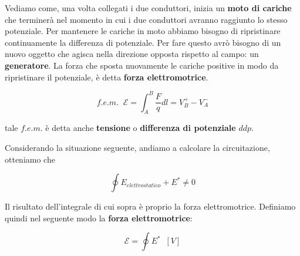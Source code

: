 Vediamo come, una volta collegati i due conduttori, inizia un \textbf{moto di cariche} che terminerà nel momento in cui i due conduttori avranno raggiunto lo stesso potenziale. Per mantenere le cariche in moto abbiamo bisogno di ripristinare continuamente la differenza di potenziale. Per fare questo avrò bisogno di un nuovo oggetto che agisca nella direzione opposta rispetto al campo: un \textbf{generatore}. La forza che sposta nuovamente le cariche positive in modo da ripristinare il potenziale, è detta \textbf{forza elettromotrice}. 

\begin{large}
	\begin{equation} \label{eq_fem}
		f.e.m. \;\; \mathcal{E} = \int_A^B \frac{F}{q} dl = V^+_B - V^-_A
	\end{equation}
\end{large}

tale $f.e.m.$ è detta anche \textbf{tensione} o \textbf{differenza di potenziale} $ddp$.

\begin{figure}[ht]
	\centering
\end{figure}

Considerando la situazione seguente, andiamo a calcolare la circuitazione, otteniamo che 

$$
\oint E_{elettrostatico} + E^* \ne 0
$$

Il risultato dell'integrale di cui sopra è proprio la forza elettromotrice. Definiamo quindi nel seguente modo la \textbf{forza elettromotrice}: 

\begin{large}
	\begin{equation}
		\mathcal{E} = \oint E^* \;\; \left[V\right]
	\end{equation}
\end{large}

